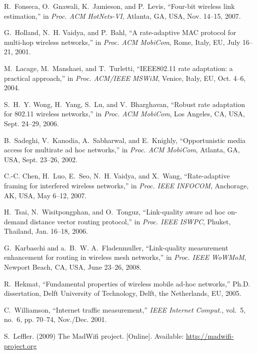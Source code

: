 \documentclass[11pt,draftclsnofoot,journal,onecolumn]{IEEEtran}
\begin{document}
\begin{thebibliography}{10}
R.~{Fonseca}, O.~{Gnawali}, K.~{Jamieson}, and P.~{Levis}, ``Four-bit wireless
  link estimation,'' in \emph{Proc. ACM HotNets-VI}, Atlanta, GA, USA, Nov.
  14--15, 2007.

G.~{Holland}, N.~H. {Vaidya}, and P.~{Bahl}, ``A rate-adaptive {MAC} protocol
  for multi-hop wireless networks,'' in \emph{Proc. ACM MobiCom}, Rome, Italy,
  EU, July 16--21, 2001.

M.~{Lacage}, M.~{Manshaei}, and T.~{Turletti}, ``{IEEE}802.11 rate adaptation:
  a practical approach,'' in \emph{Proc. ACM/IEEE MSWiM}, Venice, Italy, EU,
  Oct. 4--6, 2004.

S.~H.~Y. {Wong}, H.~{Yang}, S.~{Lu}, and V.~{Bharghavan}, ``Robust rate
  adaptation for 802.11 wireless networks,'' in \emph{Proc. ACM MobiCom}, Los
  Angeles, CA, USA, Sept. 24--29, 2006.

B.~{Sadeghi}, V.~{Kanodia}, A.~{Sabharwal}, and E.~{Knighly}, ``Opportunistic
  media access for multirate ad hoc networks,'' in \emph{Proc. ACM MobiCom},
  Atlanta, GA, USA, Sept. 23--26, 2002.

C.-C. {Chen}, H.~{Luo}, E.~{Seo}, N.~H. {Vaidya}, and X.~{Wang},
  ``Rate-adaptive framing for interfered wireless networks,'' in \emph{Proc.
  IEEE INFOCOM}, Anchorage, AK, USA, May 6--12, 2007.

H.~{Tsai}, N.~{Wisitpongphan}, and O.~{Tonguz}, ``Link-quality aware ad hoc
  on-demand distance vector routing protocol,'' in \emph{Proc. IEEE ISWPC},
  Phuket, Thailand, Jan. 16--18, 2006.

G.~{Karbaschi} and a.~B.~W. A.~{Fladenmuller}, ``Link-quality measurement
  enhancement for routing in wireless mesh networks,'' in \emph{Proc. IEEE
  WoWMoM}, Newport Beach, CA, USA, June 23--26, 2008.

R.~Hekmat, ``Fundamental properties of wireless mobile ad-hoc networks,'' Ph.D.
  dissertation, Delft University of Technology, Delft, the Netherlands, EU,
  2005.

C.~{Williamson}, ``Internet traffic measurement,'' \emph{{IEEE} Internet
  Comput.}, vol.~5, no.~6, pp. 70--74, Nov./Dec. 2001.

\BIBentryALTinterwordspacing
S.~Leffler. (2009) The {MadWifi} project. [Online]. Available:
  \url{http://madwifi-project.org}
\BIBentrySTDinterwordspacing


\end{thebibliography}
\end{document}
